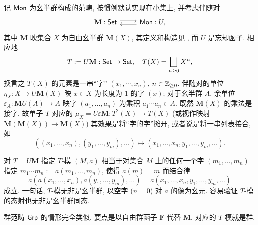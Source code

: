 \begin{example}\label{eg:Mon-monad}
	记 $\mathsf{Mon}$ 为幺半群构成的范畴, 按惯例默认实现在小集上, 并考虑伴随对
	\[\begin{tikzcd}
		\mathbf{M}: \cate{Set} \arrow[r, shift left] & \cate{Mon}: U, \arrow[l, shift left]
	\end{tikzcd}\]
	其中 $\mathbf{M}$ 映集合 $X$ 为自由幺半群 $\mathbf{M}(X)$, 其定义和构造见 \cite[定义 4.8.1, 引理 4.8.4]{Li1}, 而 $U$ 是忘却函子. 相应地
	\[ T := U\mathbf{M}: \mathsf{Set} \to \mathsf{Set}, \quad T(X) = \bigsqcup_{n \geq 0} X^n, \]
	换言之 $T(X)$ 的元素是一串``字'' $(x_1, \cdots, x_n)$, $n \in \mathbb{Z}_{\geq 0}$. 伴随对的单位 $\eta_X: X \to U\mathbf{M}(X)$ 映 $x \in X$ 为长度为 $1$ 的字 $(x)$; 对于幺半群 $A$, 余单位 $\varepsilon_A: \mathbf{M}U(A) \to A$ 映字 $(a_1, \ldots, a_n)$ 为乘积 $a_1 \cdots a_n \in A$. 既然 $\mathbf{M}(X)$ 的乘法是接字, 故单子 $T$ 对应的 $\mu_X = U \varepsilon \mathbf{M}: T^2(X) \to T(X)$ (或视作映射 $\mathbf{M}(\mathbf{M}(X)) \to \mathbf{M}(X)$) 其效果是将``字的字''摊开, 或者说是将一串列表接合, 如
	\[ \left( (x_1, \ldots, x_n), (y_1, \ldots, y_m), \ldots \right) \mapsto \left( x_1, \ldots, x_n, y_1, \ldots, y_m, \ldots \right). \]
	
	对 $T = U\mathbf{M}$ 指定 $T$-模 $(M, a)$ 相当于对集合 $M$ 上的任何一个字 $(m_1, \ldots, m_n)$ 指定 $m_1 \cdots m_n := a(m_1, \ldots, m_n)$, 使得 $a(m) = m$ 而结合律
	\[ a\left( a(x_1, \ldots, x_n), a(y_1, \ldots, y_m), \ldots \right) = a\left( x_1, \ldots, x_n, y_1, \ldots, y_m, \ldots \right) \]
	成立. 一句话, $T$-模无非是幺半群, 以空字 ($n=0$) 对 $a$ 的像为幺元. 容易验证 $T$-模的态射也无非是幺半群同态.
	
	群范畴 $\mathsf{Grp}$ 的情形完全类似, 要点是以自由群函子 $\mathbf{F}$ 代替 $\mathbf{M}$. 对应的 $T$-模就是群.
\end{example}

